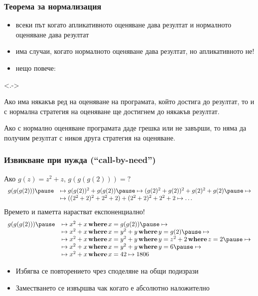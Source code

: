 \documentclass{beamer}
\begin{document}
\begin{frame}
  \frametitle{Теорема за нормализация}
  \begin{itemize}[<+->]
  \item всеки път когато апликативното оценяване дава резултат и нормалното оценяване дава резултат
  \item има случаи, когато нормалното оценяване дава резултат, но апликативното не!
  \item нещо повече:
  \end{itemize}
  \onslide<.->
  \begin{theorem}
    Ако има някакъв ред на оценяване на програмата, който достига до резултат, то и с нормална стратегия на оценяване ще достигнем до някакъв резултат.
  \end{theorem}
  \onslide<+->
  \begin{corollary}
    Ако с нормално оценяване програмата даде грешка или не завърши, то няма да получим резултат с \alert{никоя друга стратегия на оценяване}.
  \end{corollary}
\end{frame}

\begin{frame}
  \frametitle{Извикване при нужда (``call-by-need'')}

Ако $g(z) = z^2 + z$, $g(g(g(2))) = ?$
\pause
\begin{equation*}
  \begin{array}{rl}
  g(g(g(2))) \pause &\mapsto g(g(2))^2 + g(g(2)) \pause\mapsto (g(2)^2+ g(2))^2 + g(2)^2 + g(2) \pause\mapsto\\
  &\mapsto ((2^2+2)^2+2^2+2)+(2^2+2)^2 + 2^2+2 \mapsto \ldots
  \end{array}
\end{equation*}\pause
Времето и паметта нарастват експоненциално!\\
\pause
{}
\pause
\begin{equation*}
  \begin{array}{rl}
    g(g(g(2))) \pause &\mapsto x^2 + x \where x = g(g(2)) \pause \mapsto\\
    &\mapsto x^2 + x \where x = y^2 + y \where y = g(2) \pause \mapsto\\
    &\mapsto x^2 + x \where x = y^2 + y \where y = z^2 + 2 \where z = 2 \pause \mapsto\\
    &\mapsto x^2 + x \where x = y^2 + y \where y = 6 \pause \mapsto\\
    &\mapsto x^2 + x \where x = 42 \mapsto 1806
  \end{array}
\end{equation*}\pause\vspace{-1.5em}
\begin{itemize}[<+->]
\item Избягва се повторението чрез споделяне на общи подизрази
\item Заместването се извършва чак когато е \alert{абсолютно наложително}
\end{itemize}
\end{frame}
\end{document}

